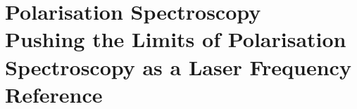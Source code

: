 \part[Polarisation Spectroscopy]{Polarisation Spectroscopy\\
\vspace{1cm}
\LARGE Pushing the Limits of Polarisation Spectroscopy as a Laser Frequency Reference}





